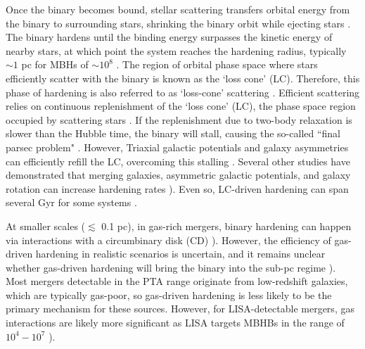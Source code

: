 \documentclass{book}
\begin{document}
Once the binary becomes bound, stellar scattering transfers orbital energy from the binary to surrounding stars, shrinking the binary orbit while ejecting stars \citep{sesana2008, Merritt_review_2005}. The binary hardens until the binding energy surpasses the kinetic energy of nearby stars, at which point the system reaches the hardening radius, typically $\sim 1$ pc for MBHs of $\sim 10^8$ \msun \citep{Begelman1980,milosavljevic_final_2003}. The region of orbital phase space where stars efficiently scatter with the binary is known as the `loss cone' (LC). Therefore, this phase of hardening is also referred to as `loss-cone' scattering \citep{Begelman1980,quinlan_dynamical_1996,quinlan_dynamical_1997,Merritt_review_2005}.  Efficient scattering relies on continuous replenishment of the `loss cone' (LC), the phase space region occupied by scattering stars \citep{Yu_2002}.  If the replenishment due to two-body relaxation is slower than the Hubble time, the binary will stall, causing the so-called ``final parsec problem" \citep{milosavljevic_final_2003}. However, Triaxial galactic potentials and galaxy asymmetries can efficiently refill the LC, overcoming this stalling \citep{Yu_2002}. Several other studies have demonstrated that merging galaxies, asymmetric galactic potentials, and galaxy rotation can increase hardening rates \citep{holleybockelmann2006lossconetriaxialgalaxies,berczik_2006,Holley_Bockelmann_2010,Preto_2011,Khan_2011,Holley-Bockelmann2015,Khan_2016}). Even so, LC-driven hardening can span several Gyr for some systems \citep{Kelley_2017a}.

At smaller scales ($\lesssim$ 0.1 pc), in gas-rich mergers, binary hardening can happen via interactions with a circumbinary disk (CD) \citep{Dotti2010,cuadra_massive_2009,nixon_tearing_2013,goicovic_infalling_2017,siwek_orbital_2023,siwek_preferential_2023}). However, the efficiency of gas-driven hardening in realistic scenarios is uncertain, and it remains unclear whether gas-driven hardening will bring the binary into the sub-pc regime \citep{lodato_black_2009,moody_hydrodynamic_2019,munoz_circumbinary_2020}). Most mergers detectable in the PTA range originate from low-redshift galaxies, which are typically gas-poor, so gas-driven hardening is less likely to be the primary mechanism for these sources. However, for LISA-detectable mergers, gas interactions are likely more significant as LISA targets MBHBs in the range of $10^4 - 10^7$ \msun \citep{dotti_supermassive_2007}).
\end{document}
